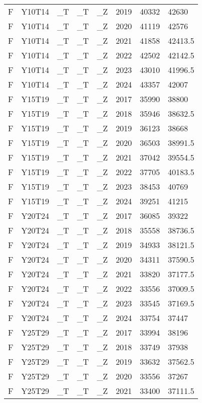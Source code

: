 \begin{longtable}[t]{llllllll}
F & Y10T14 & \_T & \_T & \_Z & 2019 & 40332 & 42630\\
F & Y10T14 & \_T & \_T & \_Z & 2020 & 41119 & 42576\\
F & Y10T14 & \_T & \_T & \_Z & 2021 & 41858 & 42413.5\\
F & Y10T14 & \_T & \_T & \_Z & 2022 & 42502 & 42142.5\\
\addlinespace
F & Y10T14 & \_T & \_T & \_Z & 2023 & 43010 & 41996.5\\
F & Y10T14 & \_T & \_T & \_Z & 2024 & 43357 & 42007\\
F & Y15T19 & \_T & \_T & \_Z & 2017 & 35990 & 38800\\
F & Y15T19 & \_T & \_T & \_Z & 2018 & 35946 & 38632.5\\
F & Y15T19 & \_T & \_T & \_Z & 2019 & 36123 & 38668\\
\addlinespace
F & Y15T19 & \_T & \_T & \_Z & 2020 & 36503 & 38991.5\\
F & Y15T19 & \_T & \_T & \_Z & 2021 & 37042 & 39554.5\\
F & Y15T19 & \_T & \_T & \_Z & 2022 & 37705 & 40183.5\\
F & Y15T19 & \_T & \_T & \_Z & 2023 & 38453 & 40769\\
F & Y15T19 & \_T & \_T & \_Z & 2024 & 39251 & 41215\\
\addlinespace
F & Y20T24 & \_T & \_T & \_Z & 2017 & 36085 & 39322\\
F & Y20T24 & \_T & \_T & \_Z & 2018 & 35558 & 38736.5\\
F & Y20T24 & \_T & \_T & \_Z & 2019 & 34933 & 38121.5\\
F & Y20T24 & \_T & \_T & \_Z & 2020 & 34311 & 37590.5\\
F & Y20T24 & \_T & \_T & \_Z & 2021 & 33820 & 37177.5\\
\addlinespace
F & Y20T24 & \_T & \_T & \_Z & 2022 & 33556 & 37009.5\\
F & Y20T24 & \_T & \_T & \_Z & 2023 & 33545 & 37169.5\\
F & Y20T24 & \_T & \_T & \_Z & 2024 & 33754 & 37447\\
F & Y25T29 & \_T & \_T & \_Z & 2017 & 33994 & 38196\\
F & Y25T29 & \_T & \_T & \_Z & 2018 & 33749 & 37938\\
\addlinespace
F & Y25T29 & \_T & \_T & \_Z & 2019 & 33632 & 37562.5\\
F & Y25T29 & \_T & \_T & \_Z & 2020 & 33556 & 37267\\
F & Y25T29 & \_T & \_T & \_Z & 2021 & 33400 & 37111.5\\

\end{longtable}
